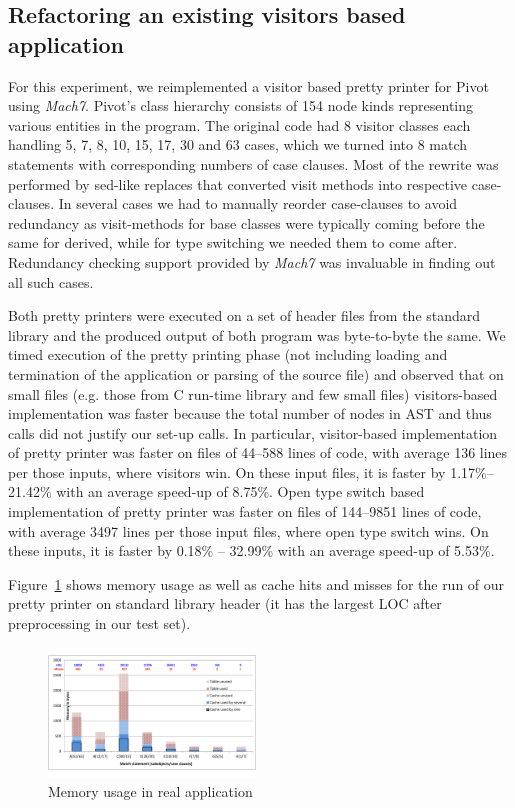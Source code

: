 \subsection{Refactoring an existing visitors based application}
\label{sec:qualcmp}

For this experiment, we reimplemented a visitor based \Cpp{} pretty printer for 
Pivot\cite{Pivot09} using \emph{Mach7}. Pivot's class hierarchy 
consists of 154 node kinds representing various entities in the \Cpp{} program. The 
original code had 8 visitor classes each handling 5, 7, 8, 10, 15, 17, 30 and 63 
cases, which we turned into 8 match statements with corresponding numbers of 
case clauses. Most of the rewrite was performed by sed-like replaces that 
converted visit methods into respective case-clauses. In several cases we had to 
manually reorder case-clauses to avoid redundancy as visit-methods for base classes 
were typically coming before the same for derived, while for type switching we 
needed them to come after. Redundancy checking support provided by \emph{Mach7} 
was invaluable in finding out all such cases.

Both pretty printers were executed on a set of header files from the \Cpp{} 
standard library and the produced output of both program was byte-to-byte the same. 
We timed execution of the pretty printing phase (not including loading and termination 
of the application or parsing of the source file) and observed that on small 
files (e.g. those from C run-time library and few small \Cpp{} files) 
visitors-based implementation was faster because the total number of nodes in 
AST and thus calls did not justify our set-up calls. In particular, 
visitor-based implementation of pretty printer was faster on files of 44--588  
lines of code, with average 136 lines per those inputs, where visitors win. On 
these input files, it is faster by 1.17\%--21.42\% with an average speed-up of 
8.75\%. Open type switch based implementation of pretty printer was faster on 
files of 144--9851 lines of code, with average 3497 lines per those input files, 
where open type switch wins. On these inputs, it is faster by 0.18\% -- 32.99\% 
with an average speed-up of 5.53\%.

Figure~\ref{fig:mem} shows memory usage as well as cache hits and misses for 
the run of our pretty printer on  standard library 
header (it has the largest LOC after preprocessing in our test set).

\begin{figure}[htbp]
  \centering
    \includegraphics[width=0.49\textwidth]{Memory.pdf}
  \caption{Memory usage in real application}
  \label{fig:mem}
\end{figure}

